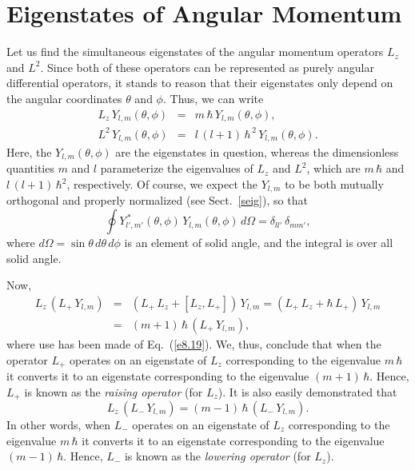 \section{Eigenstates of Angular Momentum}\label{seian}
Let us find the simultaneous eigenstates of the angular momentum
operators $L_z$ and $L^2$. Since both of these operators can
be represented as purely angular differential operators, it stands to
reason that their eigenstates  only depend on the angular coordinates
$\theta$ and $\phi$. Thus,
we can write
\begin{eqnarray}\label{e8.29}
L_z\,Y_{l,m}(\theta,\phi) &=& m\,\hbar\,Y_{l,m}(\theta,\phi),\\[0.5ex]
L^2\,Y_{l,m}(\theta,\phi) &=& l\,(l+1)\,\hbar^{\,2}\,Y_{l,m}(\theta,\phi).\label{e8.30}
\end{eqnarray}
Here, the $Y_{l,m}(\theta,\phi)$ are the eigenstates in question, whereas the dimensionless
quantities $m$ and $l$ parameterize the eigenvalues of $L_z$ and $L^2$,
which are $m\,\hbar$ and $l\,(l+1)\,\hbar^2$, respectively. Of course,
we expect the $Y_{l,m}$ to be both mutually orthogonal and properly normalized
(see Sect.~\ref{seig}), so that
\begin{equation}\label{e8.31}
\oint Y^{\,\ast}_{l',m'}(\theta,\phi)\,Y_{l,m}(\theta,\phi)\,d\Omega = \delta_{ll'}\,\delta_{mm'},
\end{equation}
where $d\Omega = \sin\theta\,d\theta\,d\phi$ is an element of solid angle,
and the integral is over all solid angle.

Now, 
\begin{eqnarray}
L_z\,(L_+\,Y_{l,m}) &=& (L_+\,L_z + [L_z, L_+])\,Y_{l,m}= (L_+\,L_z + \hbar\,L_+)\,Y_{l,m}\nonumber\\[0.5ex]
&=& (m+1)\,\hbar\,(L_+\,Y_{l,m}),
\end{eqnarray}
where use has been made of Eq.~(\ref{e8.19}). We, thus, conclude that
when the operator $L_+$ operates on an eigenstate of $L_z$ corresponding to the eigenvalue $m\,\hbar$ it converts it to an
eigenstate corresponding to the eigenvalue $(m+1)\,\hbar$.
Hence, $L_+$ is known as the {\em raising operator} (for $L_z$). It is
also easily demonstrated that
\begin{equation}\label{e8.32}
L_z\,(L_-\,Y_{l,m}) = (m-1)\,\hbar\,(L_-\,Y_{l,m}).
\end{equation}
In other words, when $L_-$ operates on an eigenstate of $L_z$ corresponding to the eigenvalue $m\,\hbar$ it converts it to an
eigenstate corresponding to the eigenvalue $(m-1)\,\hbar$.
Hence, $L_-$ is known as the {\em lowering operator} (for $L_z$).

